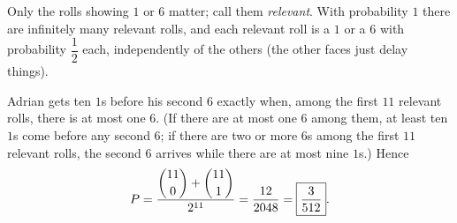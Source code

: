 Only the rolls showing $1$ or $6$ matter; call them \emph{relevant}. With probability $1$ there are infinitely many relevant rolls, and each relevant roll is a $1$ or a $6$ with probability $\dfrac{1}{2}$ each, independently of the others (the other faces just delay things).

Adrian gets ten $1$s before his second $6$ exactly when, among the first $11$ relevant rolls, there is at most one $6$. (If there are at most one $6$ among them, at least ten $1$s come before any second $6$; if there are two or more $6$s among the first $11$ relevant rolls, the second $6$ arrives while there are at most nine $1$s.) Hence
\[
P=\dfrac{\dbinom{11}{0}+\dbinom{11}{1}}{2^{11}}=\dfrac{12}{2048}=\boxed{\dfrac{3}{512}}.
\]
